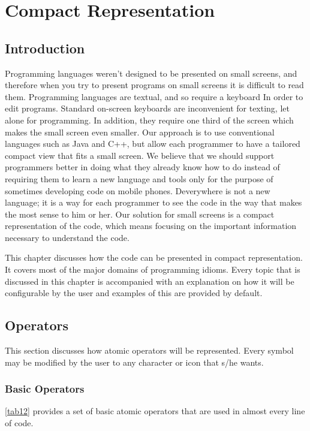 \chapter{Compact Representation} \label{chapter: Compact Representation}
\section{Introduction}
Programming languages weren't designed to be presented on small screens, and therefore when you try to present programs on small screens it is difficult to read them. Programming languages are textual, and so require a keyboard In order to edit programs. Standard on-screen keyboards are inconvenient for texting, let alone for programming. In addition, they require one third of the screen which makes the small screen even smaller. Our approach is to use conventional languages such as Java and C++, but allow each programmer to have a tailored compact view that fits a small screen. We believe that we should support programmers better in doing what they already know how to do instead of requiring them to learn a new language and tools only for the purpose of sometimes developing code on mobile phones. Deverywhere is not a new language; it is a way for each programmer to see the code in the way that makes the most sense to him or her. Our solution for small screens is a compact representation of the code, which means focusing on the important information necessary to understand the code. 

This chapter discusses how the code can be presented in compact representation. It covers most of the major domains of programming idioms. Every topic that is discussed in this chapter is accompanied with an explanation on how it will be configurable by the user and examples of this are provided by default.
\section{Operators}
This section discusses how atomic operators will be represented. Every symbol may be modified by the user to any character or icon that s/he wants.
\subsection{Basic Operators}
\autoref{tab12} provides a set of basic atomic operators that are used in almost every line of code.


